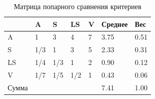 \begin{table}[H]
\centering
\caption{Матрица попарного сравнения критериев}
{\small 
\begin{tabu}to \textwidth{ | X[c] | X[c] | X[c] | X[c] | X[c] | X[c] | X[c] | }
	\hline
          & A   & S   & LS  & V & Среднее & Вес  \\ \hline
	A     & 1   & 3   & 4   & 7 & 3.75    & 0.51 \\
	S     & 1/3 & 1   & 3   & 5 & 2.33    & 0.31 \\
	LS    & 1/4 & 1/3 & 1   & 2 & 0.90    & 0.12 \\
	V     & 1/7 & 1/5 & 1/2 & 1 & 0.43    & 0.06 \\ \hline
	Сумма &     &     &     &   & 7.41    & 1.00 \\
	\hline
\end{tabu}
}
\label{tab:crit}
\end{table}